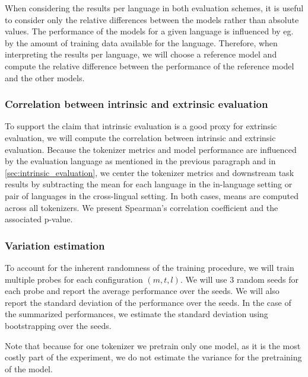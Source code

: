 When considering the results per language in both evaluation schemes, it is useful to consider only the relative differences between the models rather than absolute values. The performance of the models for a given language is influenced by eg. by the amount of training data available for the language. Therefore, when interpreting the results per language, we will choose a reference model and compute the relative difference between the performance of the reference model and the other models.

\subsubsection{Correlation between intrinsic and extrinsic evaluation}
\label{sec:correlation_intrinsic_extrinsic}

To support the claim that intrinsic evaluation is a good proxy for extrinsic evaluation, we will compute the correlation between intrinsic and extrinsic evaluation. Because the tokenizer metrics and model performance are influenced by the evaluation language as mentioned in the previous paragraph and in \autoref{sec:intrinsic_evaluation}, we center the tokenizer metrics and downstream task results by subtracting the mean for each language in the in-language setting or pair of languages in the cross-lingual setting. In both cases, means are computed across all tokenizers. We present Spearman’s correlation coefficient and the associated p-value.

\subsubsection{Variation estimation}

To account for the inherent randomness of the training procedure, we will train multiple probes for each configuration $(m, t, l)$. We will use 3 random seeds for each probe and report the average performance over the seeds. We will also report the standard deviation of the performance over the seeds. In the case of the summarized performances, we estimate the standard deviation using bootstrapping over the seeds.

Note that because for one tokenizer we pretrain only one model, as it is the most costly part of the experiment, we do not estimate the variance for the pretraining of the model.



